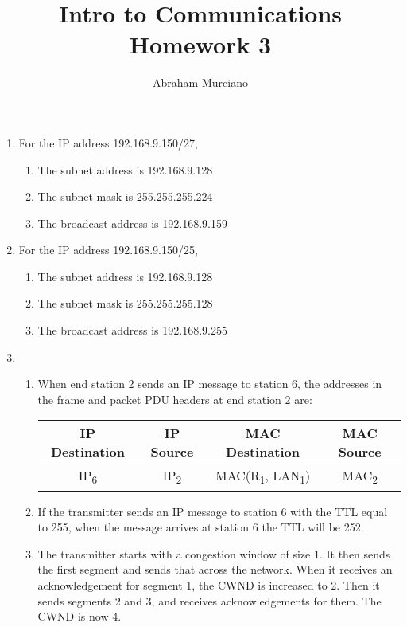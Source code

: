 \documentclass[fleqn]{article}
\title{Intro to Communications \\
\large Homework 3}
\author{Abraham Murciano}
\newenvironment{answers}{ %
	\begin{enumerate}
		\setlength{\itemsep}{\bigskipamount}
}{	\end{enumerate}	}
\newcommand{\sub}[1]{\textsubscript{#1}}
\begin{document}
\maketitle

\begin{answers}

	\item %
	For the IP address 192.168.9.150/27,
    \begin{enumerate}[label=1.\arabic*.]
		\item %
		The subnet address is 192.168.9.128
		\item %
		The subnet mask is 255.255.255.224
		\item %
		The broadcast address is 192.168.9.159
	\end{enumerate}

	\item %
	For the IP address 192.168.9.150/25,
	\begin{enumerate}[label=2.\arabic*.]
		\item %
		The subnet address is 192.168.9.128
		\item %
		The subnet mask is 255.255.255.128
		\item %
		The broadcast address is 192.168.9.255
	\end{enumerate}

	\item %
	\begin{enumerate}[label=3.\arabic*]
		\item %
		When end station 2 sends an IP message to station 6, the addresses in the frame and packet PDU headers at end station 2 are:
		\begin{table}[h]
		\centering
			\begin{tabular}{|c|c|c|c|}
				\hline
				IP Destination & IP Source & MAC Destination & MAC Source \\
				\hline
				IP\sub{6} & IP\sub{2} & MAC(R\sub{1}, LAN\sub{1}) & MAC\sub{2} \\
				\hline
			\end{tabular}
		\end{table}

		\item %
		If the transmitter sends an IP message to station 6 with the TTL equal to 255, when the message arrives at station 6 the TTL will be 252.

		\item %
		The transmitter starts with a congestion window of size 1. It then sends the first segment and sends that across the network. When it receives an acknowledgement for segment 1, the CWND is increased to 2. Then it sends segments 2 and 3, and receives acknowledgements for them. The CWND is now 4.


\end{enumerate}
\end{answers}
\end{document}
